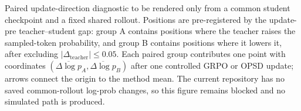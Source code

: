 \caption{Paired update-direction diagnostic to be rendered only from a common student checkpoint and a fixed shared rollout. Positions are pre-registered by the update-pre teacher--student gap: group A contains positions where the teacher raises the sampled-token probability, and group B contains positions where it lowers it, after excluding $|\Delta_{\mathrm{teacher}}|\le 0.05$. Each paired group contributes one point with coordinates $(\overline{\Delta\log p}_{A},\overline{\Delta\log p}_{B})$ after one controlled GRPO or OPSD update; arrows connect the origin to the method mean. The current repository has no saved common-rollout log-prob changes, so this figure remains blocked and no simulated path is produced.}
